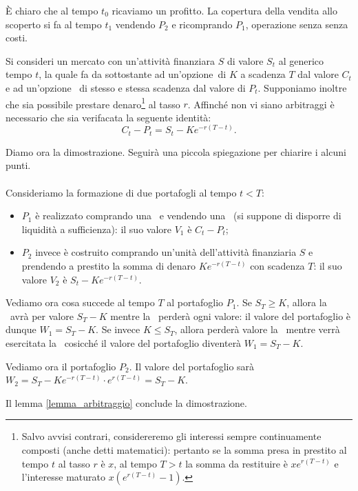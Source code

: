 \Proof \`E chiaro che al tempo $t_0$ ricaviamo un profitto. La copertura della vendita allo scoperto si fa al tempo $t_1$ vendendo $P_2$ e ricomprando $P_1$, operazione senza senza costi. \EndProof
\begin{Theorem}\label{parita_callput}
	 Si consideri un mercato con un'attivit\`a finanziara $S$ di valore $S_t$ al generico tempo $t$, la quale fa da sottostante ad un'opzione\Call\ di \Strike $K$ a scadenza $T$ dal valore $C_t$ e ad un'opzione \Put\ di stesso \Strike e stessa scadenza dal valore di $P_t$. Supponiamo inoltre che sia possibile prestare denaro\footnote{Salvo avvisi contrari, considereremo gli interessi sempre continuamente composti (anche detti matematici): pertanto se la somma presa in prestito al tempo $t$ al tasso $r$ \`e $x$, al tempo $T > t$ la somma da restituire \`e $xe^{r(T - t)}$ e l'interesse maturato $x(e^{r(T - t)} - 1)$.} al tasso $r$. Affinch\'e non vi siano arbitraggi \`e necessario che sia verifacata la seguente identit\`a: $$C_t - P_t = S_t - Ke^{-r(T-t)}.$$
\end{Theorem}
\par Diamo ora la dimostrazione. Seguir\`a una piccola spiegazione per chiarire i alcuni punti.\\\\
\Proof Consideriamo la formazione di due portafogli al tempo $t < T$:
\begin{itemize}
	\item $P_1$ \`e realizzato comprando una \Call\ e vendendo una \Put\ (si suppone di disporre di liquidit\`a a sufficienza): il suo valore $V_1$ \`e $C_t - P_t$;
	\item $P_2$ invece \`e costruito comprando un'unit\`a dell'attivit\`a finanziaria $S$ e prendendo a prestito la somma di denaro $Ke^{-r(T-t)}$ con scadenza $T$: il suo valore $V_2$ \`e $S_t - Ke^{-r(T-t)}$.
\end{itemize}
\par Vediamo ora cosa succede al tempo $T$ al portafoglio $P_1$. Se $S_T \geq K$, allora la \Call\ avr\`a per valore $S_T - K$ mentre la \Put\ perder\`a ogni valore: il valore del portafoglio \`e dunque $W_1 = S_T - K$. Se invece $K \leq S_T$, allora perder\`a valore la \Call\ mentre verr\`a esercitata la \Put\ cosicch\'e il valore del portafoglio diventer\`a $W_1 = S_T - K$.
\par Vediamo ora il portafoglio $P_2$. Il valore del portafoglio sar\`a $W_2 = S_T - Ke^{-r(T-t)} \cdot e^{r(T - t)} = S_T - K$.
\par Il lemma \ref{lemma_arbitraggio} conclude la dimostrazione. \EndProof
